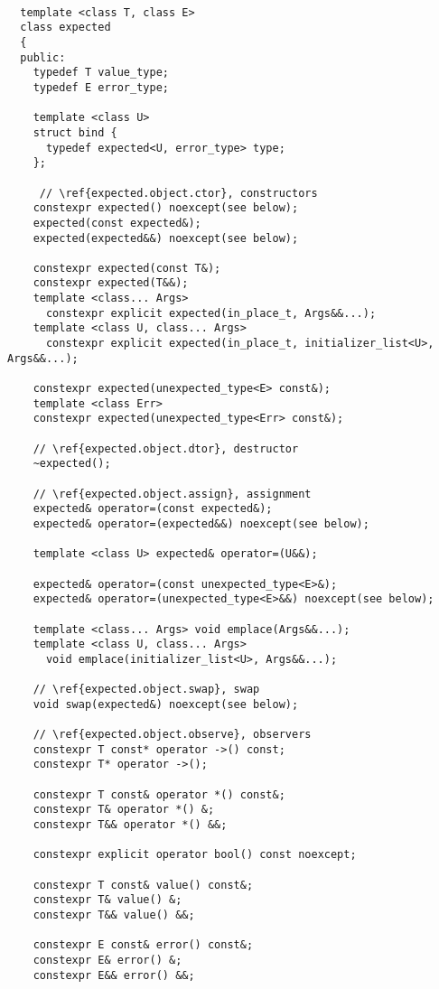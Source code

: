 \documentclass[a4paper,10pt]{article}
\begin{document}
\begin{lstlisting}

  template <class T, class E>
  class expected
  {
  public:
    typedef T value_type;
    typedef E error_type;
    
    template <class U>
    struct bind {
      typedef expected<U, error_type> type;
    };
    
     // \ref{expected.object.ctor}, constructors
    constexpr expected() noexcept(see below);
    expected(const expected&);
    expected(expected&&) noexcept(see below);
    
    constexpr expected(const T&);
    constexpr expected(T&&);
    template <class... Args> 
      constexpr explicit expected(in_place_t, Args&&...);     
    template <class U, class... Args>
      constexpr explicit expected(in_place_t, initializer_list<U>, Args&&...);
      
    constexpr expected(unexpected_type<E> const&);
    template <class Err> 
    constexpr expected(unexpected_type<Err> const&);

    // \ref{expected.object.dtor}, destructor
    ~expected();

    // \ref{expected.object.assign}, assignment
    expected& operator=(const expected&);
    expected& operator=(expected&&) noexcept(see below);
    
    template <class U> expected& operator=(U&&);
    
    expected& operator=(const unexpected_type<E>&);
    expected& operator=(unexpected_type<E>&&) noexcept(see below);
    
    template <class... Args> void emplace(Args&&...);
    template <class U, class... Args>
      void emplace(initializer_list<U>, Args&&...);

    // \ref{expected.object.swap}, swap
    void swap(expected&) noexcept(see below);

    // \ref{expected.object.observe}, observers
    constexpr T const* operator ->() const;
    constexpr T* operator ->();
    
    constexpr T const& operator *() const&;
    constexpr T& operator *() &;
    constexpr T&& operator *() &&;
    
    constexpr explicit operator bool() const noexcept;
    
    constexpr T const& value() const&;
    constexpr T& value() &;
    constexpr T&& value() &&;
    
    constexpr E const& error() const&;
    constexpr E& error() &;
    constexpr E&& error() &&;
    

\end{lstlisting}
\end{document}
